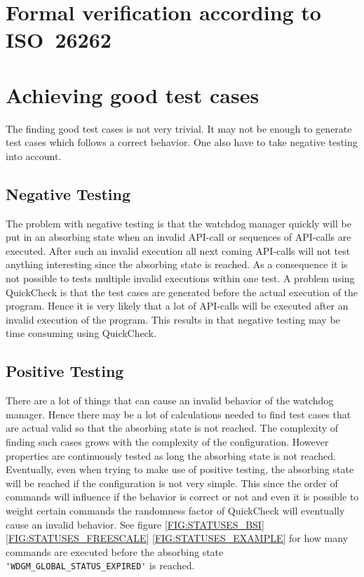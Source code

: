 \section{Formal verification according to ISO~26262}

\section{Achieving good test cases}
The finding good test cases is not very trivial. It may not be enough to
generate test cases which follows a correct behavior. One also have to take
negative testing into account.

\subsection{Negative Testing}
The problem with negative testing is that the watchdog manager quickly will be
put in an absorbing state when an invalid API-call or sequences of API-calls
are executed. After such an invalid execution all next coming API-calls will not
test anything interesting since the absorbing state is reached. As a consequence
it is not possible to tests multiple invalid executions within one test.  A
problem using QuickCheck is that the test cases are generated before the actual
execution of the program. Hence it is very likely that a lot of API-calls will
be executed after an invalid execution of the program. This results in that
negative testing may be time consuming using QuickCheck.

\subsection{Positive Testing}
There are a lot of things that can cause an invalid behavior of the watchdog
manager. Hence there may be a lot of calculations needed to find test
cases that are actual valid so that the absorbing state is not reached. The
complexity of finding such cases grows with the complexity of the
configuration. However properties are continuously tested as long the
absorbing state is not reached. Eventually, even when trying to make
use of positive testing, the absorbing state will be reached if the
configuration is not very simple. This since the order of commands
will influence if the behavior is correct or not and even it is possible to
weight certain commands the randomness factor of QuickCheck will
eventually cause an invalid behavior. See figure
\ref{FIG:STATUSES_BSI} \ref{FIG:STATUSES_FREESCALE}
\ref{FIG:STATUSES_EXAMPLE} for how many commands are executed before
the absorbing state \lstinline!'WDGM_GLOBAL_STATUS_EXPIRED'! is reached.

